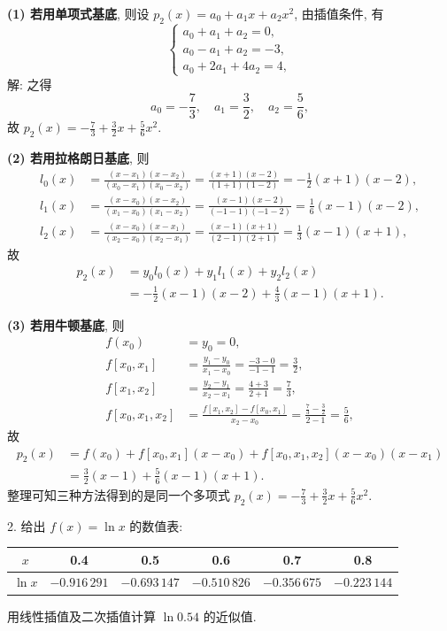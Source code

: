 \documentclass[a4paper,11pt]{ctexart}
\begin{document}
\textbf{(1) 若用单项式基底}, 则设 $p_2(x) = a_0 + a_1 x + a_2 x^2$, 由插值条件, 有
\[
\begin{cases}
a_0 + a_1 + a_2 = 0, \\
a_0 - a_1 + a_2 = -3, \\
a_0 + 2a_1 + 4a_2 = 4,
\end{cases}
\]
解: 之得
\[
a_0 = -\frac{7}{3}, \quad a_1 = \frac{3}{2}, \quad a_2 = \frac{5}{6},
\]
故 $p_2(x) = -\frac{7}{3} + \frac{3}{2}x + \frac{5}{6}x^2$.

\textbf{(2) 若用拉格朗日基底}, 则
\begin{align*}
l_0(x) &= \frac{(x-x_1)(x-x_2)}{(x_0-x_1)(x_0-x_2)} = \frac{(x+1)(x-2)}{(1+1)(1-2)} = -\frac{1}{2}(x+1)(x-2), \\
l_1(x) &= \frac{(x-x_0)(x-x_2)}{(x_1-x_0)(x_1-x_2)} = \frac{(x-1)(x-2)}{(-1-1)(-1-2)} = \frac{1}{6}(x-1)(x-2), \\
l_2(x) &= \frac{(x-x_0)(x-x_1)}{(x_2-x_0)(x_2-x_1)} = \frac{(x-1)(x+1)}{(2-1)(2+1)} = \frac{1}{3}(x-1)(x+1),
\end{align*}
故
\begin{align*}
p_2(x) &= y_0 l_0(x) + y_1 l_1(x) + y_2 l_2(x) \\
&= -\frac{1}{2}(x-1)(x-2) + \frac{4}{3}(x-1)(x+1).
\end{align*}

\textbf{(3) 若用牛顿基底}, 则
\begin{align*}
f(x_0) &= y_0 = 0, \\
f[x_0, x_1] &= \frac{y_1 - y_0}{x_1 - x_0} = \frac{-3 - 0}{-1 - 1} = \frac{3}{2}, \\
f[x_1, x_2] &= \frac{y_2 - y_1}{x_2 - x_1} = \frac{4 + 3}{2 + 1} = \frac{7}{3}, \\
f[x_0, x_1, x_2] &= \frac{f[x_1, x_2] - f[x_0, x_1]}{x_2 - x_0} = \frac{\frac{7}{3} - \frac{3}{2}}{2 - 1} = \frac{5}{6},
\end{align*}
故
\begin{align*}
p_2(x) &= f(x_0) + f[x_0, x_1](x-x_0) + f[x_0, x_1, x_2](x-x_0)(x-x_1) \\
&= \frac{3}{2}(x-1) + \frac{5}{6}(x-1)(x+1).
\end{align*}
整理可知三种方法得到的是同一个多项式 $p_2(x) = -\frac{7}{3} + \frac{3}{2}x + \frac{5}{6}x^2$.

\vspace{2em}

2. 给出 $f(x) = \ln x$ 的数值表:
\begin{center}
\begin{tabular}{c|c|c|c|c|c}
\toprule
$x$ & 0.4 & 0.5 & 0.6 & 0.7 & 0.8 \\
\midrule
$\ln x$ & $-0.916\,291$ & $-0.693\,147$ & $-0.510\,826$ & $-0.356\,675$ & $-0.223\,144$ \\
\bottomrule
\end{tabular}
\end{center}
用线性插值及二次插值计算 $\ln 0.54$ 的近似值.
\end{document}
